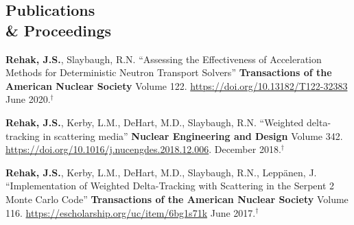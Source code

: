 \documentclass[margin,line]{resume}
\newcommand{\dagfoot}{${}^\dagger$}
\begin{document}
\begin{resume}
    \section{\mysidestyle Publications \\ \& Proceedings}
    \begin{bibsection}
    \item \textbf{Rehak, J.S.}, Slaybaugh, R.N. ``Assessing the
      Effectiveness of Acceleration Methods for Deterministic Neutron
      Transport Solvers'' \textbf{Transactions of the American Nuclear
        Society} Volume 122. \url{https://doi.org/10.13182/T122-32383} June 2020.\dagfoot
      \item \textbf{Rehak, J.S.}, Kerby, L.M., DeHart, M.D., Slaybaugh, R.N.
              ``Weighted delta-tracking in scattering media''
              \textbf{Nuclear Engineering and Design} Volume 342.
              \url{https://doi.org/10.1016/j.nucengdes.2018.12.006}. December 2018.\dagfoot
            \item \textbf{Rehak, J.S.}, Kerby, L.M., DeHart, M.D., Slaybaugh, R.N., Lepp\"{a}nen, J.
              ``Implementation of Weighted Delta-Tracking with Scattering in the Serpent 2 Monte Carlo Code''
              \textbf{Transactions of the American Nuclear Society}
              Volume
              116. \url{https://escholarship.org/uc/item/6bg1s71k} June 2017.\dagfoot
      \end{bibsection}
                


\end{resume}
\end{document}
